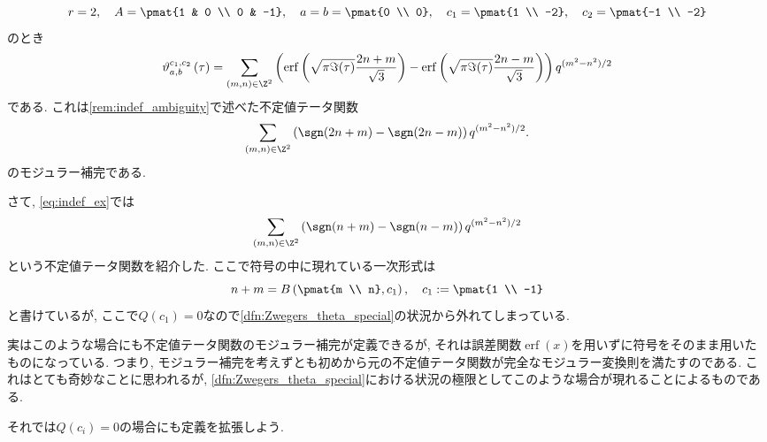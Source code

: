 \documentclass[11pt,b5paper,oneside,lualatex]{ltjsarticle} %
\DeclareMathOperator{\erf}{erf}
\numberwithin{equation}{section} %
\begin{document}
\begin{ex}{}{}
	\[
	 r = 2, \quad
	 A = \pmat{1 & 0 \\ 0 & -1}, \quad
	 a = b = \pmat{0 \\ 0}, \quad
	 c_1= \pmat{1 \\ -2}, \quad
	 c_2= \pmat{-1 \\ -2}
	\]
	のとき
	\[
	\vartheta_{a, b}^{c_1, c_2} \left( \tau \right)
	=
	\sum_{(m, n) \in \Z^2}
	\left( \erf \left( \sqrt{\pi \Im(\tau)} \frac{2n+m}{\sqrt{3}} \right) - \erf \left( \sqrt{\pi \Im(\tau)} \frac{2n-m}{\sqrt{3}} \right) \right)
	q^{(m^2 - n^2)/2}
	\]
	である. 
	これは\cref{rem:indef_ambiguity}で述べた不定値テータ関数
	\[
	\sum_{(m, n) \in \Z^2} \left( \sgn(2n+m) - \sgn(2n-m) \right) q^{(m^2 - n^2)/2}.
	\]
	のモジュラー補完である. 
\end{ex}

さて, \cref{eq:indef_ex}では
\[
\sum_{(m, n) \in \Z^2} \left( \sgn(n+m) - \sgn(n-m) \right) q^{(m^2 - n^2)/2}
\]
という不定値テータ関数を紹介した. 
ここで符号の中に現れている一次形式は
\[
n+m = B \left( \pmat{m \\ n}, c_1 \right), \quad
c_1 := \pmat{1 \\ -1}
\]
と書けているが, ここで$ Q(c_1) = 0 $なので\cref{dfn:Zwegers_theta_special}の状況から外れてしまっている. 

実はこのような場合にも不定値テータ関数のモジュラー補完が定義できるが, それは誤差関数$ \erf(x) $を用いずに符号をそのまま用いたものになっている. 
つまり, モジュラー補完を考えずとも初めから元の不定値テータ関数が完全なモジュラー変換則を満たすのである. 
これはとても奇妙なことに思われるが, \cref{dfn:Zwegers_theta_special}における状況の極限としてこのような場合が現れることによるものである. 

それでは$ Q(c_i) = 0 $の場合にも定義を拡張しよう. 
\end{document}
